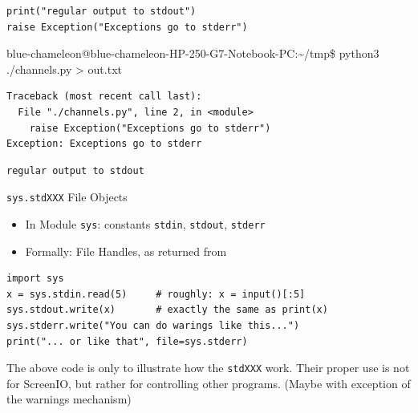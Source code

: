 \begin{frame}[fragile]
%
\begin{codebox}
\begin{verbatim}
print("regular output to stdout")
raise Exception("Exceptions go to stderr")
\end{verbatim}
\end{codebox}
%
\begin{cmdbox}
\scriptsize
{\color{green}blue-chameleon@blue-chameleon-HP-250-G7-Notebook-PC}:{\color{blue}\textasciitilde/tmp}\$
python3 ./channels.py > out.txt
\end{cmdbox}
%
\begin{cmdbox}
\begin{verbatim}
Traceback (most recent call last):
  File "./channels.py", line 2, in <module>
    raise Exception("Exceptions go to stderr")
Exception: Exceptions go to stderr
\end{verbatim}
\end{cmdbox}
%
\begin{cmdbox}
\begin{verbatim}
regular output to stdout
\end{verbatim}
\end{cmdbox}
%
\end{frame}


\begin{frame}[fragile]{\texttt{sys.stdXXX} File Objects}
%
\begin{itemize}
\item In Module \texttt{sys}: constants \texttt{stdin}, \texttt{stdout}, \texttt{stderr}
\item Formally: File Handles, as returned from 
\end{itemize}
%
\begin{codebox}
\begin{verbatim}
import sys
x = sys.stdin.read(5)     # roughly: x = input()[:5]
sys.stdout.write(x)       # exactly the same as print(x)
sys.stderr.write("You can do warings like this...")
print("... or like that", file=sys.stderr)
\end{verbatim}
\end{codebox}
%
\begin{hintbox}
\small
The above code is only to illustrate how the \texttt{stdXXX} work. Their proper use is not for ScreenIO, but rather for controlling other programs. (Maybe with exception of the warnings mechanism)
\end{hintbox}
%
\end{frame}

